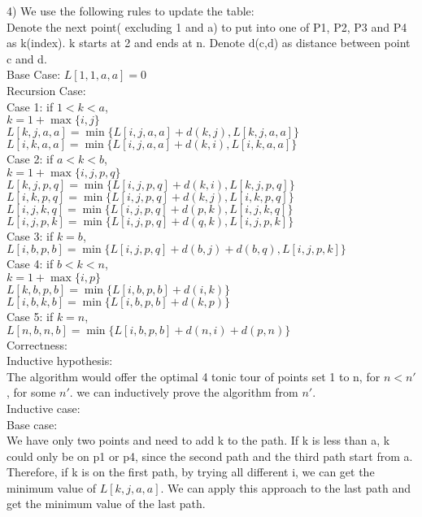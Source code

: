 \documentclass[12pt,letterpaper]{article}
\begin{document}
4) We use the following rules to update the table: \\
Denote the next point( excluding 1 and a) to put into one of P1, P2, P3 and P4 as k(index). k starts at 2 and ends at n. Denote d(c,d) as distance between point c and d. \\
Base Case:  $L[1,1,a,a]=0$ \\
Recursion Case: \\
Case 1: if $1<k<a$, \\
$k = 1+\max\{i,j\}$ \\
$L[k,j,a,a]= \min \{L[i,j,a,a] + d(k,j), L[k,j,a,a] \}$ \\
$L[i,k,a,a]= \min \{L[i,j,a,a] + d(k,i), L[i,k,a,a] \}$ \\
Case 2: if $a<k<b$, \\
$ k = 1+\max \{i,j,p,q \} $ \\
$L[k,j,p,q] = \min \{L[i,j,p,q] + d(k,i), L[k,j,p,q] \}$ \\ 
$L[i,k,p,q] = \min \{L[i,j,p,q] + d(k,j), L[i,k,p,q] \}$ \\
$L[i,j,k,q] = \min \{L[i,j,p,q] + d(p,k), L[i,j,k,q] \}$ \\
$L[i,j,p,k] = \min \{L[i,j,p,q] + d(q,k), L[i,j,p,k] \}$ \\
Case 3: if $k=b$, \\
$L[i,b,p,b] = \min \{ L[i,j,p,q] + d(b,j) + d(b,q), L[i,j,p,k] \}$ \\
Case 4: if $b<k<n$, \\
$k=1 + \max \{i,p\}$ \\
$L[k,b,p,b] = \min \{L[i,b,p,b] + d(i,k) \}$ \\
$L[i,b,k,b] = \min \{L[i,b,p,b] + d(k,p) \}$ \\
Case 5: if $k=n$, \\
$L[n,b,n,b] = \min \{L[i,b,p,b] + d(n,i) + d(p,n) \}$ \\
Correctness: \\
Inductive hypothesis: \\
The algorithm would offer the optimal 4 tonic tour of points set 1 to n, for $n < n'$, for some $n'$. we can inductively prove the algorithm from $n'$. \\
Inductive case: \\
Base case: \\
We have only two points and need to add k to the path. If k is less than a, k could only be on p1 or p4, since the second path and the third path start from a. Therefore, if k is on the first path, by trying all different i, we can get the minimum value of $L[k, j, a, a]$. We can apply this approach to the last path and get the minimum value of the last path.\\ 
\end{document}

